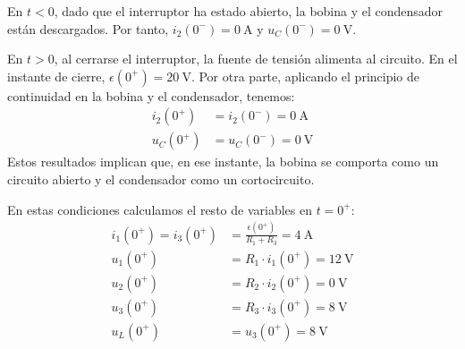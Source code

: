 En $t < 0$, dado que el interruptor ha estado abierto, la bobina y el condensador están descargados. Por tanto, $i_2(0^-) = \qty{0}{\ampere}$ y $u_C(0^-) = \qty{0}{\volt}$.

\smallskip
\begin{minipage}{0.5\linewidth}
En $t > 0$, al cerrarse el interruptor, la fuente de tensión alimenta al circuito. En el instante de cierre, $\epsilon(0^+) = \qty{20}{\volt}$. Por otra parte, aplicando el principio de continuidad en la bobina y el condensador, tenemos:
\begin{align*}
  i_2(0^+) &= i_2(0^-) = \qty{0}{\ampere}\\
  u_C(0^+) &= u_C(0^-) = \qty{0}{\volt}
\end{align*}
Estos resultados implican que, en ese instante, la bobina se comporta como un circuito abierto y el condensador como un cortocircuito. 
\end{minipage}
\begin{minipage}{0.5\linewidth}
\end{minipage}
\smallskip

En estas condiciones calculamos el resto de variables en $t = 0^+$:
\begin{align*}
  i_1(0^+) = i_3(0^+) &= \frac{\epsilon(0^+)}{R_1 + R_3} = \qty{4}{\ampere}\\
  u_1(0^+) &= R_1 \cdot i_1(0^+) = \qty{12}{\volt}\\
  u_2(0^+) &= R_2 \cdot i_2(0^+) = \qty{0}{\volt}\\
  u_3(0^+) &= R_3 \cdot i_3(0^+) = \qty{8}{\volt}\\
  u_L(0^+) &= u_3(0^+) = \qty{8}{\volt}
\end{align*}


